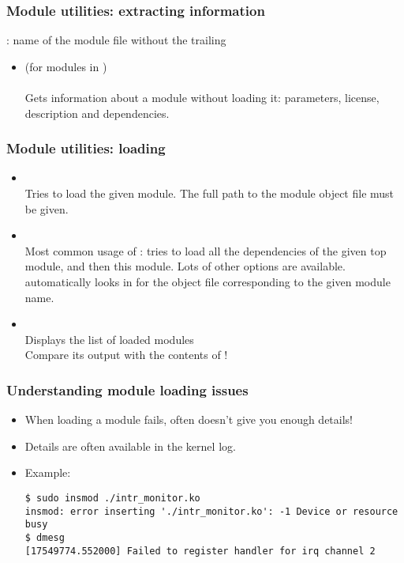 \begin{frame}
  \frametitle{Module utilities: extracting information}
  : name of the module file without the trailing \\
  \begin{itemize}
  \item {} (for modules in )\\
    \\
    Gets information about a module without loading it: parameters, license,
    description and dependencies.\\
  \end{itemize}
\end{frame}

\begin{frame}
  \frametitle{Module utilities: loading}
  \begin{itemize}
  \item {}\\
    Tries to load the given module. The full path to the module object
    file must be given.
  \item {}\\
    Most common usage of : tries to load all the
    dependencies of the given top module, and then this module. Lots of
    other options are available.  automatically looks in
     for the object file corresponding
    to the given module name.
  \item {}\\
    Displays the list of loaded modules\\
    Compare its output with the contents of !
  \end{itemize}
\end{frame}

\begin{frame}[fragile]
  \frametitle{Understanding module loading issues}
  \begin{itemize}
  \item When loading a module fails,  often doesn't give
    you enough details!
  \item Details are often available in the kernel log.
  \item Example:\\
\scriptsize
\begin{verbatim}
$ sudo insmod ./intr_monitor.ko
insmod: error inserting './intr_monitor.ko': -1 Device or resource busy
$ dmesg
[17549774.552000] Failed to register handler for irq channel 2
\end{verbatim}
  \end{itemize}
\end{frame}

